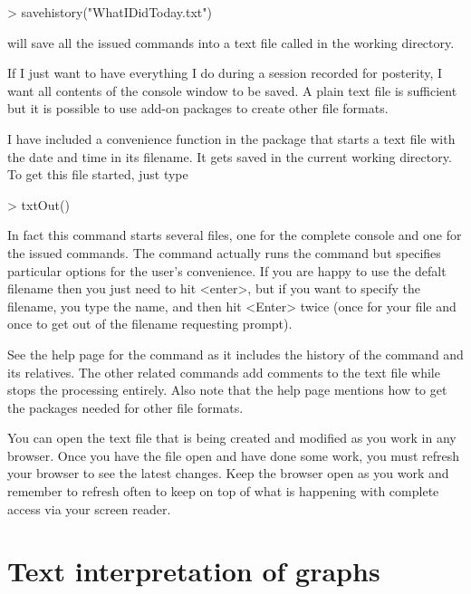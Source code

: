 \begin{Schunk}
\begin{Sinput}
> savehistory("WhatIDidToday.txt") 
\end{Sinput}
\end{Schunk}

will save all the issued commands into a text file called  in the working directory.  
 
If I just want to have everything I do during a session recorded for posterity, I want all contents of the console window to be saved. A plain text file is sufficient but it is possible to use add-on packages to create other file formats. 
 
I have included a convenience function in the  package that starts a text file with the date and time in its filename. It gets saved in the current working directory. To get this file started, just type 

\begin{Schunk}
\begin{Sinput}
> txtOut() 
\end{Sinput}
\end{Schunk}

In fact this command starts several files, one for the complete console and one for the issued commands. The command actually runs the  command but specifies particular options for the user's convenience. If you are happy to use the defalt filename then you just need to hit <enter>, but if you want to specify the filename, you type the name, and then hit <Enter> twice (once for your file and once to get out of the filename requesting prompt). 
 
See the help page for the  command as it includes the history of the command and its relatives. The other related commands add comments to the text file while  stops the processing entirely. Also note that the help page mentions how to get the packages needed for other file formats. 
 
 
You can open the text file that is being created and modified as you work in any browser. Once you have the file open and have done some work, you must  refresh your browser to see the latest changes. Keep the browser open as you work and remember to refresh often to keep on top of what is happening with complete access via your screen reader. 
 
\section{Text interpretation of graphs} 
\label{VIExplained}
 
